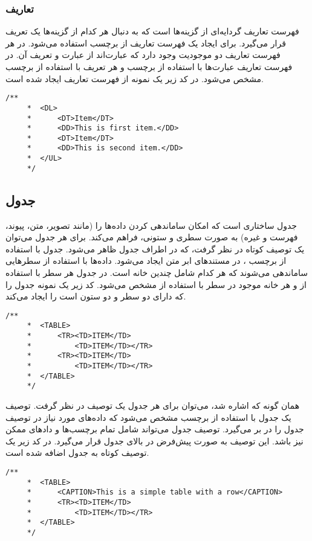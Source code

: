\subsubsection{تعاریف}
فهرست تعاریف گردایه‌ای از گزینه‌ها است که به دنبال هر کدام از گزینه‌ها یک تعریف قرار می‌گیرد.
برای ایجاد یک فهرست تعاریف از برچسب  استفاده می‌شود. در هر فهرست تعاریف دو
موجودیت وجود دارد که عبارت‌اند از عبارت و تعریف آن. در فهرست تعاریف عبارت‌ها با استفاده
از برچسب  و هر تعریف با استفاده از برچسب  مشخص می‌شود. در کد زیر 
یک نمونه از فهرست تعاریف ایجاد شده است.
\begin{latin}
\lstset{language=C++}  
\begin{lstlisting}[frame=single] 
    /**
     *	<DL>
     * 		<DT>Item</DT>
     * 		<DD>This is first item.</DD>
     * 		<DT>Item</DT>
     * 		<DD>This is second item.</DD>
     * 	</UL>
     */
\end{lstlisting}
\end{latin}

\subsection{جدول}
جدول ساختاری است که امکان ساماندهی کردن داده‌ها را (مانند تصویر، متن، پیوند، فهرست و غیره)
به صورت سطری و ستونی، فراهم می‌کند. برای هر جدول می‌توان یک توصیف کوتاه در نظر گرفت، که 
در اطراف جدول ظاهر می‌شود. جدول با استفاده از برچسب ، در مستندهای ابر متن ایجاد
می‌شود. داده‌ها با استفاده از سطرهایی ساماندهی می‌شوند که هر کدام شامل چندین خانه است. در جدول هر سطر 
با استفاده از  و هر خانه موجود در سطر با استفاده از  مشخص می‌شود. کد زیر یک نمونه
جدول را که دارای دو سطر و دو ستون است را ایجاد می‌کند.
\begin{latin}
\lstset{language=C++}  
\begin{lstlisting}[frame=single] 
    /**
     *	<TABLE>
     * 		<TR><TD>ITEM</TD>
     * 			<TD>ITEM</TD></TR>
     * 		<TR><TD>ITEM</TD>
     * 			<TD>ITEM</TD></TR>
     * 	</TABLE>
     */
\end{lstlisting}
\end{latin}
همان گونه که اشاره شد، می‌توان برای هر جدول یک توصیف در نظر گرفت. توصیف یک جدول با استفاده از
 برچسب  مشخص می‌شود که داده‌های مورد نیاز در توصیف جدول را در بر می‌گیرد.
 توصیف جدول می‌تواند شامل تمام برچسب‌ها و دادهای ممکن نیز باشد. این توصیف به صورت پیش‌فرض
 در بالای جدول قرار می‌گیرد. در کد زیر یک توصیف کوتاه به جدول اضافه شده است.
\begin{latin}
\lstset{language=C++}  
\begin{lstlisting}[frame=single] 
    /**
     *	<TABLE>
     * 		<CAPTION>This is a simple table with a row</CAPTION>
     * 		<TR><TD>ITEM</TD>
     * 			<TD>ITEM</TD></TR>
     * 	</TABLE>
     */
\end{lstlisting}
\end{latin}

